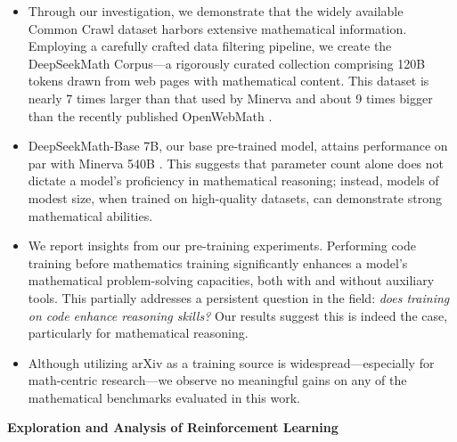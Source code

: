 \begin{itemize}[topsep=0pt]
    \item Through our investigation, we demonstrate that the widely available Common Crawl dataset harbors extensive mathematical information. Employing a carefully crafted data filtering pipeline, we create the DeepSeekMath Corpus—a rigorously curated collection comprising 120B tokens drawn from web pages with mathematical content. This dataset is nearly 7 times larger than that used by Minerva \citep{minerva} and about 9 times bigger than the recently published OpenWebMath \citep{openwebmath}.

    \item DeepSeekMath-Base 7B, our base pre-trained model, attains performance on par with Minerva 540B \citep{minerva}. This suggests that parameter count alone does not dictate a model’s proficiency in mathematical reasoning; instead, models of modest size, when trained on high-quality datasets, can demonstrate strong mathematical abilities.

    \item We report insights from our pre-training experiments. Performing code training before mathematics training significantly enhances a model's mathematical problem-solving capacities, both with and without auxiliary tools. This partially addresses a persistent question in the field: \textit{does training on code enhance reasoning skills?} Our results suggest this is indeed the case, particularly for mathematical reasoning.

    \item Although utilizing arXiv as a training source is widespread—especially for math-centric research—we observe no meaningful gains on any of the mathematical benchmarks evaluated in this work.
\end{itemize}

\textbf{Exploration and Analysis of Reinforcement Learning}

